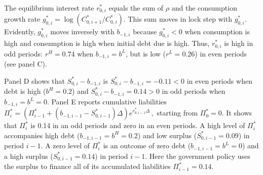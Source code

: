 \documentclass[12pt]{article}
\begin{document}
The  equilibrium interest rate  $r_{0,i}^\ast$ equals the sum of  $\rho$ and the consumption growth rate $g_{0,i}^\ast= \log({C}_{0,i+1}^\ast/{C}_{0,i}^\ast)$.   This sum   moves in lock step with   $ g_{0,i}^\ast$. Evidently,  $ g_{0,i}^\ast$ moves inversely with  $b_{-1, i} $  because 
$g_{0,i}^\ast<0$  when  consumption is high and consumption is high when initial  debt due  is high. %
Thus,   $r_{0, i}^\ast$ is high  in odd periods: $r^H =0.74$ when $b_{-1, i} = b^L$, but  is low ($r^L=0.26$) in even periods  (see panel C). 


Panel D  shows that $S_{0,i}^\ast - b_{-1,i}$  is  
$S_{0,i}^\ast - b_{-1,i}=-0.11 < 0$ in even periods when debt is high ($b^H=0.2$) and $S_{0,i}^\ast - b_{-1,i}=0.14 >0$ in odd periods when $b_{-1,i}=b^L=0$. 
Panel E reports  cumulative liabilities %
$	\Pi_{i}^* = \left(\Pi_{i-1}^* +(b_{-1, i-1}-S_{0, i-1}^*)\Delta \right)e^{r_{0, i-1}^*\Delta}\,, 
$ 
starting from $\Pi_0^\ast=0$. It shows that   $\Pi_{i}^\ast$ is 0.14 in an odd periods  and zero  in an even periods.  A high level of $\Pi_{i}^\ast$ accompanies high debt ($b_{-1,i-1}=b^H=0.2$) and low surplus ($S_{0,i-1}^\ast=0.09$) in  period $i-1$. A zero level of $\Pi_{i}^\ast$  is an outcome of zero debt ($b_{-1,i-1}=b^L=0$) and  a high surplus ($S_{0,i-1}^\ast=0.14$) in  period $i-1$.  Here the government policy uses the surplus  to finance  all of its accumulated  liabilities $\Pi_{i-1}^*=0.14$. %
\end{document}
